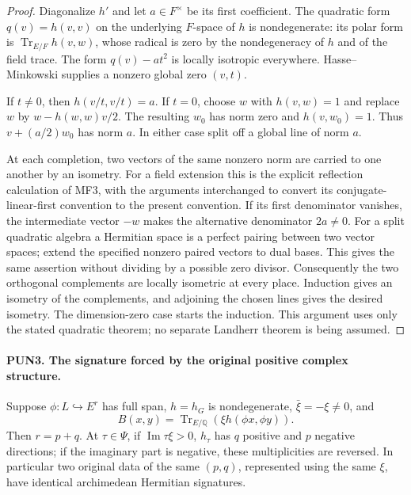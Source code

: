 \documentclass[11pt,a4paper]{article}
\numberwithin{equation}{section}
\theoremstyle{remark}\newtheorem{remark}[theorem]{Remark}
\begin{document}
\begin{proof}
Diagonalize \(h'\) and let \(a\in F^\times\) be its first
coefficient.  The quadratic form \(q(v)=h(v,v)\) on the underlying
\(F\)-space of \(h\) is nondegenerate: its polar form is
\(\operatorname{Tr}_{E/F}h(v,w)\), whose radical is zero by the
nondegeneracy of \(h\) and of the field trace.  The form
\(q(v)-a t^2\) is locally isotropic everywhere.  Hasse--Minkowski
supplies a nonzero global zero \((v,t)\).

If \(t\ne0\), then \(h(v/t,v/t)=a\).  If \(t=0\), choose
\(w\) with \(h(v,w)=1\) and replace \(w\) by
\(w-h(w,w)v/2\).  The resulting \(w_0\) has norm zero and
\(h(v,w_0)=1\).  Thus \(v+(a/2)w_0\) has norm \(a\).
In either case split off a global line of norm \(a\).

At each completion, two vectors of the same nonzero norm are
carried to one another by an isometry.  For a field extension this
is the explicit reflection calculation of MF3, with the arguments
interchanged to convert its conjugate-linear-first convention to
the present convention.  If its first denominator vanishes, the
intermediate vector \(-w\) makes the alternative denominator
\(2a\ne0\).  For a split quadratic algebra a Hermitian space is
a perfect pairing between two vector spaces; extend the specified
nonzero paired vectors to dual bases.  This gives the same assertion
without dividing by a possible zero divisor.  Consequently the two
orthogonal complements are locally isometric at every place.
Induction gives an isometry of the complements, and adjoining the
chosen lines gives the desired isometry.  The dimension-zero case
starts the induction.  This argument uses only the stated quadratic
theorem; no separate Landherr theorem is being assumed.
\end{proof}

\paragraph{PUN3. The signature forced by the original positive complex structure.}
\label{claim:PUN3}
Suppose \(\phi:L\hookrightarrow E^r\) has full span, \(h=h_G\)
is nondegenerate, \(\bar\xi=-\xi\ne0\), and
\[
              B(x,y)=\operatorname{Tr}_{E/\mathbb Q}
                              (\xi h(\phi x,\phi y)).
 \tag{PUN.4}
\]
Then \(r=p+q\).  At \(\tau\in\Psi\), if
\(\operatorname{Im}\tau\xi>0\), \(h_\tau\) has \(q\)
positive and \(p\) negative directions; if the imaginary part is
negative, these multiplicities are reversed.  In particular two
original data of the same \((p,q)\), represented using the same
\(\xi\), have identical archimedean Hermitian signatures.
\end{document}
